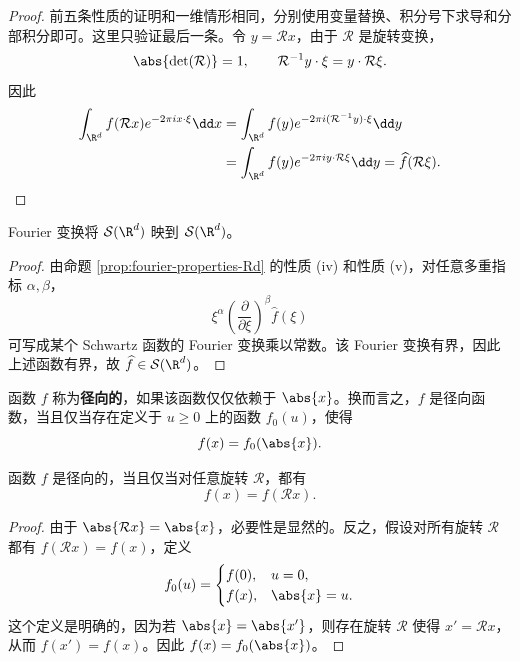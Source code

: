 \begin{proof}
	前五条性质的证明和一维情形相同，分别使用变量替换、积分号下求导和分部积分即可。这里只验证最后一条。令 $y=\mathcal{R}x$，由于 $\mathcal{R}$ 是旋转变换，
	\[
	\abs{\det(\mathcal{R})}=1,
	\qquad
	\mathcal{R}^{-1}y\cdot\xi=y\cdot \mathcal{R}\xi.
	\]
	因此
	\[
	\begin{aligned}
	\int_{\R^d}f(\mathcal{R}x)e^{-2\pi i x\cdot\xi}\dd x
	&=\int_{\R^d}f(y)e^{-2\pi i(\mathcal{R}^{-1}y)\cdot\xi}\dd y\\
	&=\int_{\R^d}f(y)e^{-2\pi i y\cdot \mathcal{R}\xi}\dd y
	=\widehat f(\mathcal{R}\xi).
	\end{aligned}
	\]
\end{proof}
\begin{corollary}\label{cor:fourier-maps-schwartz-Rd}
	Fourier 变换将 $\mathcal S(\R^d)$ 映到 $\mathcal S(\R^d)$。
\end{corollary}

\begin{proof}
	由命题 \ref{prop:fourier-properties-Rd} 的性质 (iv) 和性质 (v)，对任意多重指标 $\alpha,\beta$，
	\[
	\xi^\alpha
	\left(\frac{\partial}{\partial\xi}\right)^\beta
	\widehat f(\xi)
	\]
	可写成某个 Schwartz 函数的 Fourier 变换乘以常数。该 Fourier 变换有界，因此上述函数有界，故 $\widehat f\in\mathcal S(\R^d)$。
\end{proof}

\begin{definition}
	函数 $f$ 称为\textbf{径向的}，如果该函数仅仅依赖于 $\abs{x}$。换而言之，$f$ 是径向函数，当且仅当存在定义于 $u\geq0$ 上的函数 $f_0(u)$，使得
	\[
	f(x)=f_0(\abs{x}).
	\]
\end{definition}

\begin{proposition}\label{prop:radial-rotation-invariant}
	函数 $f$ 是径向的，当且仅当对任意旋转 $\mathcal{R}$，都有
	\[
	f(x)=f(\mathcal{R}x).
	\]
\end{proposition}

\begin{proof}
	由于 $\abs{\mathcal{R}x}=\abs{x}$，必要性是显然的。反之，假设对所有旋转 $\mathcal{R}$ 都有 $f(\mathcal{R}x)=f(x)$，定义
	\[
	f_0(u)=
	\begin{cases}
		f(0),&u=0,\\
		f(x),&\abs{x}=u.
	\end{cases}
	\]
	这个定义是明确的，因为若 $\abs{x}=\abs{x'}$，则存在旋转 $\mathcal{R}$ 使得 $x'=\mathcal{R}x$，从而 $f(x')=f(x)$。因此 $f(x)=f_0(\abs{x})$。
\end{proof}

